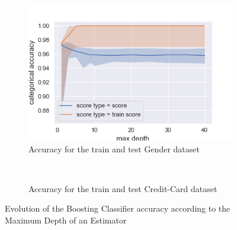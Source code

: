 \documentclass[10pt]{article}
\begin{document}
		\paragraph*{}
			\begin{figure}[h]
				\centering
				\begin{subfigure}[]{0.45\columnwidth}
					\centering
					\includegraphics[width=\linewidth]{../graphics/boost_gender_max_depth_score_type_score_type.png}
					\caption{Accuracy for the train and test Gender dataset}
					\label{boost_sc_train_vs_test}
				\end{subfigure}
				~
				\begin{subfigure}[]{0.45\columnwidth}
					\centering
					\caption{Accuracy for the train and test Credit-Card dataset}
					\label{boost_cc_train_vs_test}
				\end{subfigure}
				\caption{Evolution of the Boosting Classifier accuracy according to the Maximum Depth of an Estimator}
				\label{boost_train_vs_test}
			\end{figure}
\end{document}

